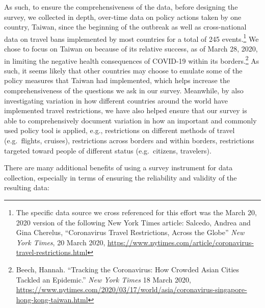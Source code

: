 \documentclass[
]{article}
\begin{document}
As such, to ensure the comprehensiveness of the data, before designing the survey, we collected in depth, over-time data on policy actions taken by one country, Taiwan, since the beginning of the outbreak as well as cross-national data on travel bans implemented by most countries for a total of 245 events.\footnote{The specific data source we cross referenced for this effort was the March 20, 2020 version of the following New York Times article: Salcedo, Andrea and Gina Cherelus, ``Coronavirus Travel Restrictions, Across the Globe'' \emph{New York Times}, 20 March 2020, \url{https://www.nytimes.com/article/coronavirus-travel-restrictions.html}} We chose to focus on Taiwan on because of its relative success, as of March 28, 2020, in limiting the negative health consequences of COVID-19 within its borders.\footnote{Beech, Hannah. ``Tracking the Coronavirus: How Crowded Asian Cities Tackled an Epidemic.'' \emph{New York Times} 18 March 2020, \url{https://www.nytimes.com/2020/03/17/world/asia/coronavirus-singapore-hong-kong-taiwan.html}} As such, it seems likely that other countries may choose to emulate some of the policy measures that Taiwan had implemented, which helps increase the comprehensiveness of the questions we ask in our survey. Meanwhile, by also investigating variation in how different countries around the world have implemented travel restrictions, we have also helped ensure that our survey is able to comprehensively document variation in how an important and commonly used policy tool is applied, e.g., restrictions on different methods of travel (e.g.~flights, cruises), restrictions across borders and within borders, restrictions targeted toward people of different status (e.g.~citizens, travelers).

There are many additional benefits of using a survey instrument for data collection, especially in terms of ensuring the reliability and validity of the resulting data:
\end{document}
